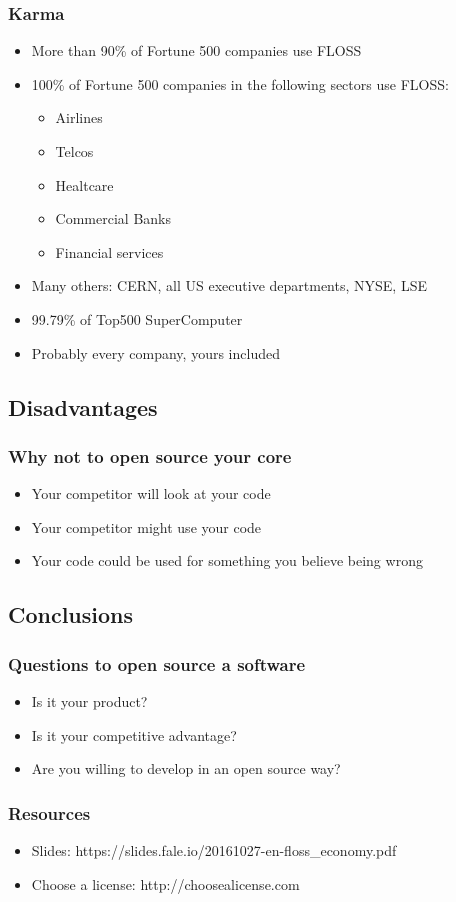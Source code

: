 \documentclass[t,aspectratio=169]{beamer}
\begin{document}
\begin{frame}
    \frametitle{Karma}
    \begin{itemize}
        \item<2-> More than 90\% of Fortune 500 companies use FLOSS
        \item<3-> 100\% of Fortune 500 companies in the following sectors use FLOSS:
        \begin{itemize}
            \item<3-> Airlines
            \item<3-> Telcos
            \item<3-> Healtcare
            \item<3-> Commercial Banks
            \item<3-> Financial services
        \end{itemize}
        \item<4-> Many others: CERN, all US executive departments, NYSE, LSE
        \item<5-> 99.79\% of Top500 SuperComputer
        \item<6-> Probably every company, yours included
    \end{itemize}
\end{frame}

\subsection{Disadvantages}
\begin{frame}
    \frametitle{Why not to open source your core}
    \begin{itemize}
        \item<2-> Your competitor will look at your code
        \item<3-> Your competitor might use your code
        \item<4-> Your code could be used for something you believe being wrong
    \end{itemize}
\end{frame}

\subsection{Conclusions}
\begin{frame}
    \frametitle{Questions to open source a software}
    \begin{itemize}
        \item<2-> Is it your product?
        \item<3-> Is it your competitive advantage?
        \item<4-> Are you willing to develop in an open source way?
    \end{itemize}
\end{frame}

\begin{frame}
    \frametitle{Resources}
    \begin{itemize}
        \item Slides: https://slides.fale.io/20161027-en-floss\_economy.pdf
        \item Choose a license: http://choosealicense.com
    \end{itemize}
\end{frame}
\end{document}
